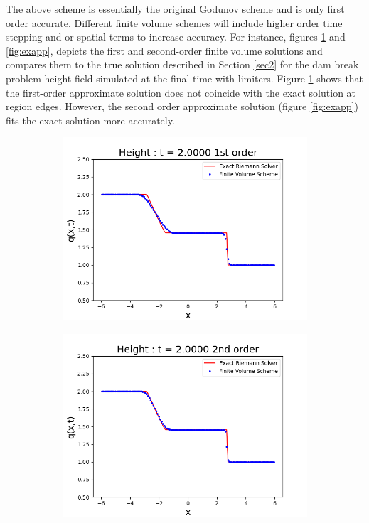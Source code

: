 \documentclass[10pt,a4paper]{article}
\begin{document}
	The above  scheme is essentially the original Godunov scheme  \citep{godunov1959difference} and is only first order accurate.  Different finite volume schemes will include higher order time stepping and or spatial terms to increase accuracy.  For instance, figures \ref{fig:exap} and \ref{fig:exapp}, depicts the first and second-order finite volume solutions and compares them to the true solution described in Section \ref{sec2} for the dam break problem height field simulated at the final time with limiters. Figure \ref{fig:exap}  shows that the first-order approximate solution does not coincide with the exact solution at region edges. However, the second order approximate solution (figure \ref{fig:exapp})  fits the exact solution more accurately. 
	\begin{figure}[H]
		\begin{subfigure}[b]{0.5\textwidth}
			\centering
			\includegraphics[width=1.0\linewidth]{images/exap}
			\caption{}
			\label{fig:exap}
		\end{subfigure}
		\begin{subfigure}[b]{0.5\textwidth}
			\centering
			\includegraphics[width=1.0\linewidth]{images/exapp}

\end{subfigure}
\end{figure}
\end{document}
